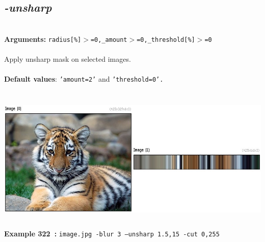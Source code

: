 \documentclass[a4paper,11pt,twoside]{book}
\begin{document}
\subsection{\emph{-unsharp} }\vspace*{-0.5em}
~\\\textbf{Arguments: } 
{\small \texttt{radius[\%]$>$=0,\_amount$>$=0,\_threshold[\%]$>$=0}}\\~\\
Apply unsharp mask on selected images.
~\\~\\\textbf{Default values}: {\small \texttt{'amount=2'} and \texttt{'threshold=0'.}}
\begin{center}\includegraphics[keepaspectratio=true,height=7cm,width=\textwidth]{img/gmic_def322.jpg}\\
{\footnotesize \textbf{Example 322~:} \texttt{image.jpg -blur 3 --unsharp 1.5,15 -cut 0,255}}
\end{center}
\end{document}
